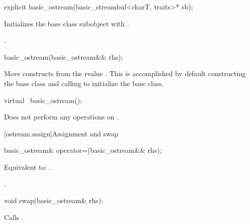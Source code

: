 %
\begin{itemdecl}
explicit basic_ostream(basic_streambuf<charT, traits>* sb);
\end{itemdecl}

%
\begin{itemdescr}
\pnum
\effects
Initializes the base class subobject with
.

\pnum
\ensures
{}.
\end{itemdescr}

%
\begin{itemdecl}
basic_ostream(basic_ostream&& rhs);
\end{itemdecl}

\begin{itemdescr}
\pnum
\effects
Move constructs from the rvalue .
This is accomplished by default constructing the base class and calling
 to initialize the
base class.
\end{itemdescr}

%
\begin{itemdecl}
virtual ~basic_ostream();
\end{itemdecl}

\begin{itemdescr}
\pnum
\remarks
Does not perform any operations on
.
\end{itemdescr}

[ostream.assign]{Assignment and swap}

%
\begin{itemdecl}
basic_ostream& operator=(basic_ostream&& rhs);
\end{itemdecl}

\begin{itemdescr}
\pnum
\effects
Equivalent to: .

\pnum
\returns
{}.
\end{itemdescr}

%
\begin{itemdecl}
void swap(basic_ostream& rhs);
\end{itemdecl}

\begin{itemdescr}
\pnum
\effects
Calls .
\end{itemdescr}

